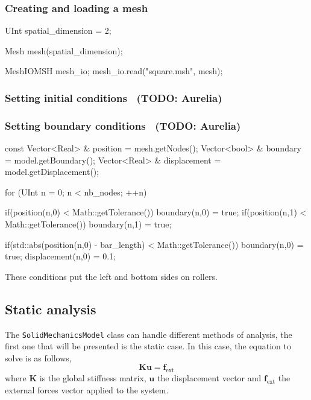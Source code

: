 \documentclass[a4paper,11pt]{book}
\newcommand{\code}[1]{\texttt{#1}}
\newcommand{\todo}[1]{~({\small\color{red}\textbf{TODO: }\textbf{#1}})}
\renewcommand{\vec}[1]{\ensuremath{\boldsymbol{#1}}}
\newcommand{\mat}[1]{\ensuremath{\boldsymbol{#1}}}
\newcommand{\st}[1]{{\mathrm{#1}}}
\begin{document}
\subsubsection{Creating and loading a mesh\label{sect:common:mesh}}

\begin{cpp}
  UInt spatial_dimension = 2;

  Mesh mesh(spatial_dimension);

  MeshIOMSH mesh_io;
  mesh_io.read("square.msh", mesh);
\end{cpp}

\subsubsection{Setting   initial  conditions  \label{sect:smm:initial_condition}
  \todo{Aurelia}}
\subsubsection{Setting        boundary        conditions\label{sect:smm:boundary}
  \todo{Aurelia}}

\begin{cpp}
  const  Vector<Real> & position = mesh.getNodes();
  Vector<bool> & boundary = model.getBoundary();
  Vector<Real> & displacement = model.getDisplacement();

  for (UInt n = 0; n < nb_nodes; ++n) {
    if(position(n,0) < Math::getTolerance()) boundary(n,0) = true;
    if(position(n,1) < Math::getTolerance()) boundary(n,1) = true;

    if(std::abs(position(n,0) - bar_length) < Math::getTolerance()) {
      boundary(n,0) = true;
      displacement(n,0) = 0.1;
    }
  }
\end{cpp}
These conditions put the left and bottom sides on rollers.\\


\subsection{Static analysis\label{sect:smm:static}}

The \code{SolidMechanicsModel}  class can handle different  methods of analysis,
the first  one that will  be presented  is the static  case.  In this  case, the
equation to solve is as follows,
\begin{equation}\label{eqn:smm:static}
  \mat{K} \vec{u} = \vec{f_{\st{ext}}}
\end{equation}
where  $\mat{K}$ is  the  global stiffness  matrix,  $\vec{u}$ the  displacement
vector  and  $\vec{f_{\st{ext}}}$ the  external  forces  vector  applied to  the
system.
\end{document}
